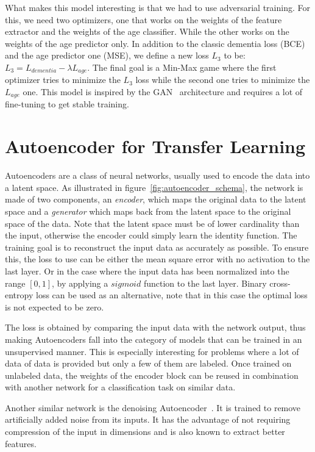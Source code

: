 What makes this model interesting is that we had to use adversarial training. For this, we need two optimizers, one that works on the weights of the feature extractor and the weights of the age classifier. While the other works on the weights of the age predictor only. In addition to the classic dementia loss (BCE) and the age predictor one (MSE), we define a new loss $L_{3}$ to be: $L_3 = L_{dementia} - \lambda L_{age}$. The final goal is a Min-Max game where the first optimizer tries to minimize the $L_3$ loss while the second one tries to minimize the $L_{age}$ one. This model is inspired by the GAN~\cite{goodfellow2014generative} architecture and requires a lot of fine-tuning to get stable training.


\section{Autoencoder for Transfer Learning}
Autoencoders are a class of neural networks, usually used to encode the data into a latent space. As illustrated in figure~\ref{fig:autoencoder_schema}, the network is made of two components, an \textit{encoder}, which maps the original data to the latent space and a \textit{generator} which maps back from the latent space to the original space of the data. Note that the latent space must be of lower cardinality than the input, otherwise the encoder could simply learn the identity function. The training goal is to reconstruct the input data as accurately as possible. To ensure this, the loss to use can be either the mean square error with no activation to the last layer. Or in the case where the input data has been normalized into the range $[0, 1]$, by applying a $sigmoid$ function to the last layer. Binary cross-entropy loss can be used as an alternative, note that in this case the optimal loss is not expected to be zero.

The loss is obtained by comparing the input data with the network output, thus making Autoencoders fall into the category of models that can be trained in an unsupervised manner. This is especially interesting for problems where a lot of data of data is provided but only a few of them are labeled. Once trained on unlabeled data, the weights of the encoder block can be reused in combination with another network for a classification task on similar data.

Another similar network is the denoising Autoencoder~\cite{denoising_autoencoder_10.5555/1756006.1953039}. It is trained to remove artificially added noise from its inputs. It has the advantage of not requiring compression of the input in dimensions and is also known to extract better features.

